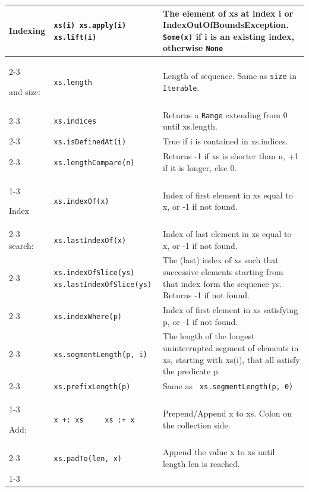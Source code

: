 \documentclass[article, a5paper]{memoir}
\renewcommand{\arraystretch}{0.9}
\begin{document}
{\small\renewcommand{\arraystretch}{1.1}
\begin{tabular}{@{}l p{3.75cm} p{6.8cm}}


  Indexing & \texttt{xs(i) xs.apply(i) xs.lift(i)} & The element of xs at index i or IndexOutOfBoundsException. \newline \texttt{Some(x)} if i is an existing index, otherwise \texttt{None}\\   \cline{2-3}

  and size: & \texttt{xs.length} & Length of sequence. Same as \texttt{size} in \texttt{Iterable}.\\\cline{2-3}
  & \texttt{xs.indices} & Returns a \texttt{Range} extending from 0 until xs.length.\\\cline{2-3}
  & \texttt{xs.isDefinedAt(i)} & True if i is contained in xs.indices.\\\cline{2-3}
  & \texttt{xs.lengthCompare(n)} & Returns -1 if xs is shorter than n, +1 if it is longer, else 0. \\\cline{1-3}


  Index & \texttt{xs.indexOf(x)} & Index of first element in xs equal to x, or -1 if not found.\\   \cline{2-3}
  search: & \texttt{xs.lastIndexOf(x)} & Index of last element in xs equal to x, or -1 if not found.\\\cline{2-3}
   & \texttt{xs.indexOfSlice(ys) \newline xs.lastIndexOfSlice(ys)} & The (last) index of xs such that successive elements starting from that index form the sequence ys. Returns -1 if not found.\\\cline{2-3}
   & \texttt{xs.indexWhere(p)} & Index of first element in xs satisfying p, or -1 if not found.\\\cline{2-3}
   & \texttt{xs.segmentLength(p, i)} & The length of the longest uninterrupted segment of elements in xs, starting with xs(i), that all satisfy the predicate p.\\\cline{2-3}
   & \texttt{xs.prefixLength(p)} &  	Same as \texttt{ xs.segmentLength(p, 0)}\\\cline{1-3}


  Add: & {\texttt{x~+:~xs~~~~~xs~:+~x}}  & Prepend/Append x to xs. Colon on the collection side. \\   \cline{2-3}
   & \texttt{xs.padTo(len, x)} & Append the value x to xs until length len is reached.\\\cline{1-3}



\end{tabular}}
\end{document}
